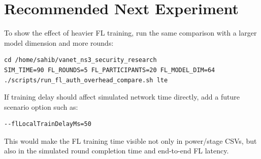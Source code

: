 \documentclass[11pt,a4paper]{article}
\begin{document}
\section{Recommended Next Experiment}

To show the effect of heavier FL training, run the same comparison with a larger
model dimension and more rounds:

\begin{lstlisting}[style=cmdstyle,caption={Recommended heavier FL comparison command.}]
cd /home/sahib/vanet_ns3_security_research
SIM_TIME=90 FL_ROUNDS=5 FL_PARTICIPANTS=20 FL_MODEL_DIM=64 ./scripts/run_fl_auth_overhead_compare.sh lte
\end{lstlisting}

If training delay should affect simulated network time directly, add a future
scenario option such as:

\begin{lstlisting}[style=cmdstyle,caption={Proposed future option for simulated FL training delay.}]
--flLocalTrainDelayMs=50
\end{lstlisting}

This would make the FL training time visible not only in power/stage CSVs, but
also in the simulated round completion time and end-to-end FL latency.
\end{document}
